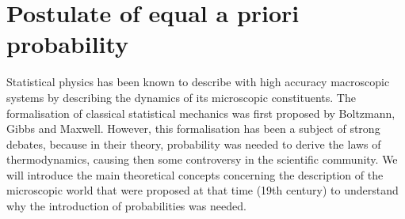 \section{Postulate of equal a priori probability}
Statistical physics has been known to describe with high accuracy macroscopic systems by describing the dynamics of its microscopic constituents. The formalisation of classical statistical mechanics was first proposed by Boltzmann, Gibbs and Maxwell. However, this formalisation has been a subject of strong debates, because in their theory, probability was needed to derive the laws of thermodynamics, causing then some controversy \cite{uffink_handbook_2007} in the scientific community. We will introduce the main theoretical concepts concerning the description of the microscopic world that were proposed at that time (19th century) to understand why the introduction of probabilities was needed.\\
 


